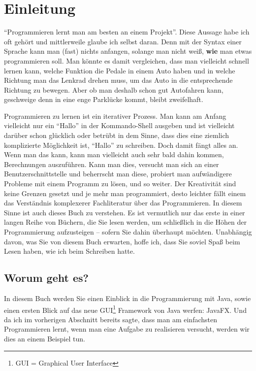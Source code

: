 
\chapter{Einleitung}

"`Programmieren lernt man am besten an einem Projekt"'. Diese Aussage habe ich oft gehört und mittlerweile glaube ich selbst daran. Denn mit der Syntax einer Sprache kann man (fast) nichts anfangen, solange man nicht weiß, \textbf{wie} man etwas programmieren soll. Man könnte es damit vergleichen, dass man vielleicht schnell lernen kann, welche Funktion die Pedale in einem Auto haben und in welche Richtung man das Lenkrad drehen muss, um das Auto in die entsprechende Richtung zu bewegen. Aber ob man deshalb schon gut Autofahren kann, geschweige denn in eine enge Parklücke kommt, bleibt zweifelhaft.  

Programmieren zu lernen ist ein iterativer Prozess. Man kann am Anfang vielleicht nur ein "`Hallo"' in der Kommando-Shell ausgeben und ist vielleicht darüber schon glücklich oder betrübt in dem Sinne, dass dies eine ziemlich komplizierte Möglichkeit ist, "`Hallo"' zu schreiben. Doch damit fängt alles an. Wenn man das kann, kann man vielleicht auch sehr bald dahin kommen, Berechnungen auszuführen. Kann man dies, versucht man sich an einer Benutzerschnittstelle und beherrscht man diese, probiert man aufwändigere Probleme mit einem Programm zu lösen, und so weiter. Der Kreativität sind keine Grenzen gesetzt und je mehr man programmiert, desto leichter fällt einem das Verständnis komplexerer Fachliteratur über das Programmieren. In diesem Sinne ist auch dieses Buch zu verstehen. Es ist vermutlich nur das erste in einer langen Reihe von Büchern, die Sie lesen werden, um schließlich in die Höhen der Programmierung aufzusteigen -- sofern Sie dahin überhaupt möchten. Unabhängig davon, was Sie von diesem Buch erwarten, hoffe ich, dass Sie soviel Spaß beim Lesen haben, wie ich beim Schreiben hatte. 

\section{Worum geht es?}

In diesem Buch werden Sie einen Einblick in die Programmierung mit Java, sowie einen ersten Blick auf das neue GUI\footnote{GUI = Graphical User Interface} Framework von Java werfen: JavaFX. Und da ich im vorherigen Abschnitt bereits sagte, dass man am einfachsten Programmieren lernt, wenn man eine Aufgabe zu realisieren versucht, werden wir dies an einem Beispiel tun. 

